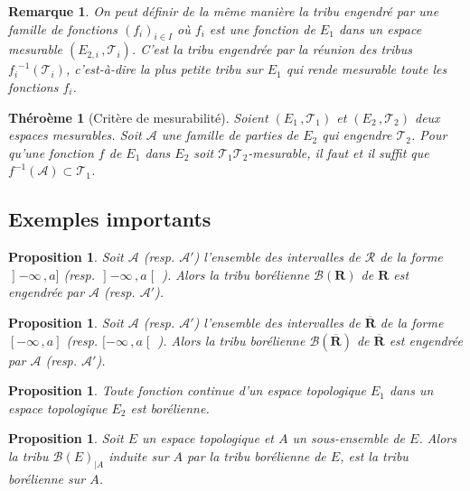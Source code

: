 \documentclass{scrreport}
\theoremstyle{def}
\theoremstyle{thm}
\newtheorem{theorem}[definition]{Théroème}
\theoremstyle{prop}
\newtheorem{proposition}[definition]{Proposition}
\theoremstyle{rem}
\newtheorem{remark}[definition]{Remarque}
\numberwithin{definition}{section}
\numberwithin{lemma}{section}
\numberwithin{proposition}{section}
\numberwithin{theorem}{section}
\numberwithin{corol}{section}
\numberwithin{notation}{section}
\numberwithin{example}{section}
\numberwithin{exercise}{section}
\numberwithin{remark}{section}
\newcommand{\R}{\mathbf{R}}
\newcommand{\RR}{\overline{\R}}
\newcommand{\scrA}{\mathscr{A}}
\newcommand{\scrB}{\mathscr{B}}
\newcommand{\scrR}{\mathscr{R}}
\newcommand{\scrT}{\mathscr{T}}
\newcommand{\lio}{\mathopen{]}}
\newcommand{\rio}{\mathclose{[}}
\begin{document}
\begin{remark}\label{rem1:5:9}
	On peut définir de la même manière la tribu engendré par une famille de fonctions \({(f_i)}_{i \in I}\) où \(f_i\) est une fonction de \(E_1\) dans un espace mesurable \((E_{2,i}\,, \scrT_i)\). C'est la tribu engendrée par la réunion des tribus \({f_i}^{-1}(\scrT_i)\), c'est-à-dire la plus petite tribu sur \(E_1\) qui rende mesurable toute les fonctions \(f_i\).
\end{remark}

\begin{theorem}[Critère de mesurabilité]\label{thm1:5:10}
	Soient \((E_1\,, \scrT_1)\) et \((E_2\,, \scrT_2)\) deux espaces mesurables. Soit \(\scrA\) une famille de parties de \(E_2\) qui engendre \(\scrT_2\). Pour qu'une fonction \(f\) de \(E_1\) dans \(E_2\) soit \(\scrT_1 \scrT_2\)-mesurable, il faut et il suffit que \(f^{-1}(\scrA) \subset \scrT_1\).
\end{theorem}

\subsection{Exemples importants}

\begin{proposition}\label{prop1:5:11}
	Soit \(\scrA\) (resp. \(\scrA'\)) l'ensemble des intervalles de \(\scrR\) de la forme \(\lio-\infty\,, a]\) (resp. \(\lio-\infty\,, a\rio\) ). Alors la tribu borélienne \(\scrB(\R)\) de \(\R\) est engendrée par \(\scrA\) (resp. \(\scrA'\)).
\end{proposition}

\begin{proposition}\label{prop1:5:12}
	Soit \(\scrA\) (resp. \(\scrA'\)) l'ensemble des intervalles de \(\RR\) de la forme \([-\infty\,, a]\) (resp. \([-\infty\,, a\rio\) ). Alors la tribu borélienne \(\scrB(\RR)\) de \(\RR\) est engendrée par \(\scrA\) (resp. \(\scrA'\)).
\end{proposition}

\begin{proposition}\label{prop1:5:13}
	Toute fonction continue d'un espace topologique \(E_1\) dans un espace topologique \(E_2\) est borélienne.
\end{proposition}

\begin{proposition}\label{prop1:5:14}
	Soit \(E\) un espace topologique et \(A\) un sous-ensemble de \(E\). Alors la tribu \(\scrB(E)_{|A}\) induite sur \(A\) par la tribu borélienne de \(E\), est la tribu borélienne sur \(A\).
\end{proposition}
\end{document}
